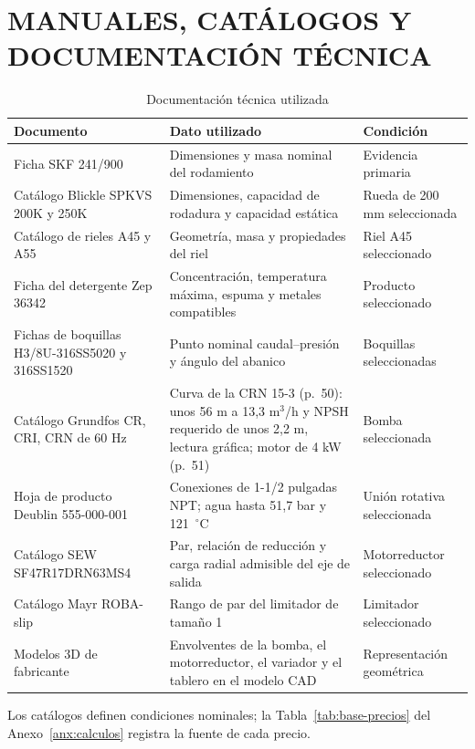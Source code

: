 \chapter{MANUALES, CATÁLOGOS Y DOCUMENTACIÓN TÉCNICA}
\label{anx:manuales}

\begin{table}[H]
\centering
\small
\caption{Documentación técnica utilizada}
\begin{tabularx}{\textwidth}{P{3.4cm}YP{2.8cm}}
\toprule
\textbf{Documento} & \textbf{Dato utilizado} & \textbf{Condición} \\
\midrule
Ficha SKF 241/900 & Dimensiones y masa nominal del rodamiento \cite{skf241} & Evidencia primaria \\
Catálogo Blickle SPKVS 200K y 250K & Dimensiones, capacidad de rodadura y capacidad estática \cite{blickle2026} & Rueda de 200 mm seleccionada \\
Catálogo de rieles A45 y A55 & Geometría, masa y propiedades del riel \cite{arcelor2023} & Riel A45 seleccionado \\
Ficha del detergente Zep 36342 & Concentración, temperatura máxima, espuma y metales compatibles \cite{zep36342} & Producto seleccionado \\
Fichas de boquillas H3/8U-316SS5020 y 316SS1520 & Punto nominal caudal--presión y ángulo del abanico \cite{manSpray} & Boquillas seleccionadas \\
Catálogo Grundfos CR, CRI, CRN de 60 Hz & Curva de la CRN 15-3 (p.~50): unos 56 m a 13,3 m$^3$/h y NPSH requerido de unos 2,2 m, lectura gráfica; motor de 4 kW (p.~51) \cite{grundfoscr} & Bomba seleccionada \\
Hoja de producto Deublin 555-000-001 & Conexiones de 1-1/2 pulgadas NPT; agua hasta 51,7 bar y 121~$^\circ$C \cite{deublin555} & Unión rotativa seleccionada \\
Catálogo SEW SF47R17DRN63MS4 & Par, relación de reducción y carga radial admisible del eje de salida & Motorreductor seleccionado \\
Catálogo Mayr ROBA-slip & Rango de par del limitador de tamaño 1 & Limitador seleccionado \\
Modelos 3D de fabricante & Envolventes de la bomba, el motorreductor, el variador y el tablero en el modelo CAD & Representación geométrica \\
\bottomrule
\end{tabularx}
\par\smallskip\footnotesize
Los catálogos definen condiciones nominales; la Tabla~\ref{tab:base-precios} del Anexo~\ref{anx:calculos} registra la fuente de cada precio.
\end{table}
